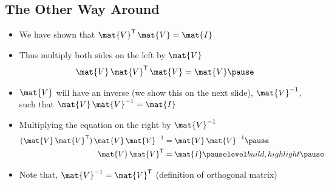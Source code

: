 \begin{slide}
\section[-2]{The Other Way Around}

\begin{PauseHighLight}
  \begin{itemize}
  \item We have shown that $\mat{V}^\tr \, \mat{V} = \mat{I}$\pause
  \item Thus multiply both sides on the left by $\mat{V}$
    \begin{align*}
      \mat{V}\,\mat{V}^\tr \, \mat{V} = \mat{V}\pause
    \end{align*}
  \item $\mat{V}$ will have an inverse (we show this on the next slide),
    $\mat{V}^{-1}$, such that
    $\mat{V} \, \mat{V}^{-1} = \mat{I}$\pause
  \item Multiplying the equation on the right by $\mat{V}^{-1}$
    \begin{align*}
      (\mat{V}\,\mat{V}^\tr) \, \mat{V} \, \mat{V}^{-1}
      &= \mat{V}\,\mat{V}^{-1}\pause  \\
      \mat{V}\,\mat{V}^\tr &= \mat{I}\pauseb
    \end{align*}
  \item Note that, $\mat{V}^{-1}=\mat{V}^\tr$ (definition of
    orthogonal matrix)\pause
  \end{itemize}
\end{PauseHighLight}

\end{slide}


